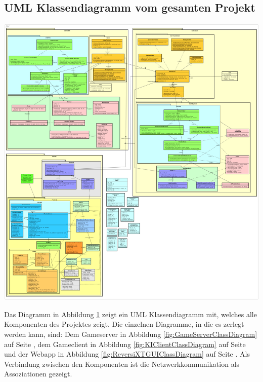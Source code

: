 \documentclass[12pt,a4paper,bibliography=totocnumbered,listof=totocnumbered]{article}
\begin{document}
\begin{appendix}
\section{UML Klassendiagramm vom gesamten Projekt}
\label{apx:AllClassDiagrams}
\vspace{1em}
\begin{minipage}{\linewidth}
	\centering
	\includegraphics[width=1.0\linewidth]{pics/AllClassDiagrams.png}
\end{minipage}

Das Diagramm in Abbildung \ref{apx:AllClassDiagrams} zeigt ein UML Klassendiagramm mit, welches alle Komponenten des Projektes zeigt.
Die einzelnen Diagramme, in die es zerlegt werden kann, sind: Dem Gameserver in Abbildung \ref{fig:GameServerClassDiagram} auf Seite \pageref{fig:GameServerClassDiagram},
dem Gameclient in Abbildung \ref{fig:KIClientClassDiagram} auf Seite \pageref{fig:KIClientClassDiagram} und der Webapp in Abbildung \ref{fig:ReversiXTGUIClassDiagram}
auf Seite \pageref{fig:ReversiXTGUIClassDiagram}. Als Verbindung zwischen den Komponenten ist die Netzwerkkommunikation als Assoziationen gezeigt. 

\pagebreak


\end{appendix}
\end{document}
